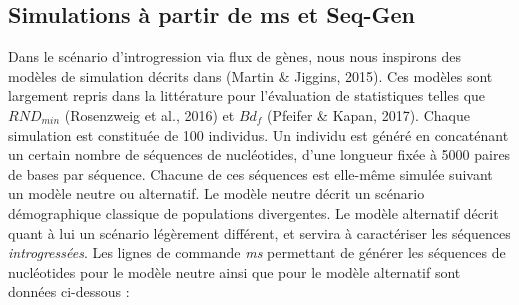 \documentclass[12pt,twoside]{ugathesis}
\begin{document}
  \newpage
  
  \subsection{Simulations à partir de ms et
  Seq-Gen}\label{simulations-a-partir-de-ms-et-seq-gen}
  
  Dans le scénario d'introgression via flux de gènes, nous nous inspirons
  des modèles de simulation décrits dans (Martin \& Jiggins, 2015). Ces
  modèles sont largement repris dans la littérature pour l'évaluation de
  statistiques telles que \(RND_{min}\) (Rosenzweig et al., 2016) et
  \(Bd_f\) (Pfeifer \& Kapan, 2017). Chaque simulation est constituée de
  100 individus. Un individu est généré en concaténant un certain nombre
  de séquences de nucléotides, d'une longueur fixée à 5000 paires de bases
  par séquence. Chacune de ces séquences est elle-même simulée suivant un
  modèle neutre ou alternatif. Le modèle neutre décrit un scénario
  démographique classique de populations divergentes. Le modèle alternatif
  décrit quant à lui un scénario légèrement différent, et servira à
  caractériser les séquences \emph{introgressées}. Les lignes de commande
  \emph{ms} permettant de générer les séquences de nucléotides pour le
  modèle neutre ainsi que pour le modèle alternatif sont données
  ci-dessous :
  
\end{document}
